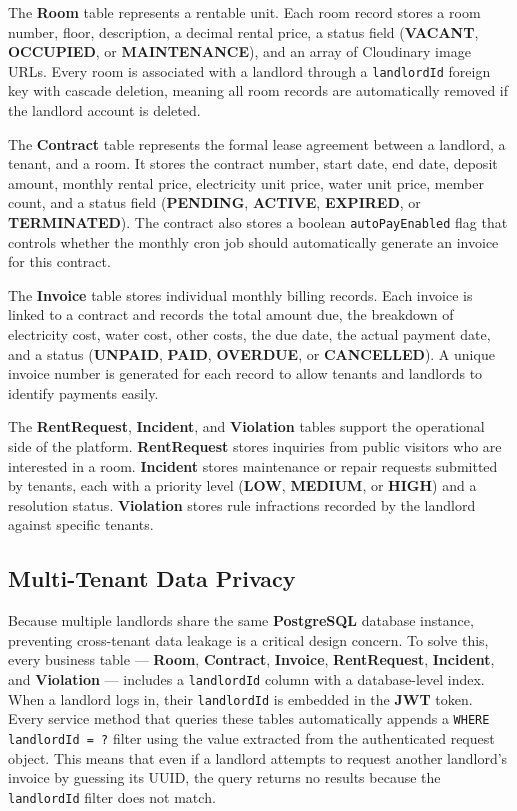 The \textbf{Room} table represents a rentable unit. Each room record stores a room number, floor, description, a decimal rental price, a status field (\textbf{VACANT}, \textbf{OCCUPIED}, or \textbf{MAINTENANCE}), and an array of Cloudinary image URLs. Every room is associated with a landlord through a \texttt{landlordId} foreign key with cascade deletion, meaning all room records are automatically removed if the landlord account is deleted.

The \textbf{Contract} table represents the formal lease agreement between a landlord, a tenant, and a room. It stores the contract number, start date, end date, deposit amount, monthly rental price, electricity unit price, water unit price, member count, and a status field (\textbf{PENDING}, \textbf{ACTIVE}, \textbf{EXPIRED}, or \textbf{TERMINATED}). The contract also stores a boolean \texttt{autoPayEnabled} flag that controls whether the monthly cron job should automatically generate an invoice for this contract.

The \textbf{Invoice} table stores individual monthly billing records. Each invoice is linked to a contract and records the total amount due, the breakdown of electricity cost, water cost, other costs, the due date, the actual payment date, and a status (\textbf{UNPAID}, \textbf{PAID}, \textbf{OVERDUE}, or \textbf{CANCELLED}). A unique invoice number is generated for each record to allow tenants and landlords to identify payments easily.

The \textbf{RentRequest}, \textbf{Incident}, and \textbf{Violation} tables support the operational side of the platform. \textbf{RentRequest} stores inquiries from public visitors who are interested in a room. \textbf{Incident} stores maintenance or repair requests submitted by tenants, each with a priority level (\textbf{LOW}, \textbf{MEDIUM}, or \textbf{HIGH}) and a resolution status. \textbf{Violation} stores rule infractions recorded by the landlord against specific tenants.

\subsection{Multi-Tenant Data Privacy}
Because multiple landlords share the same \textbf{PostgreSQL} database instance, preventing cross-tenant data leakage is a critical design concern. To solve this, every business table — \textbf{Room}, \textbf{Contract}, \textbf{Invoice}, \textbf{RentRequest}, \textbf{Incident}, and \textbf{Violation} — includes a \texttt{landlordId} column with a database-level index. When a landlord logs in, their \texttt{landlordId} is embedded in the \textbf{JWT} token. Every service method that queries these tables automatically appends a \texttt{WHERE landlordId = ?} filter using the value extracted from the authenticated request object. This means that even if a landlord attempts to request another landlord's invoice by guessing its UUID, the query returns no results because the \texttt{landlordId} filter does not match.


